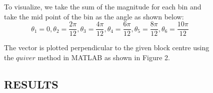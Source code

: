 \documentclass[letter, 10pt]{article}
\begin{document}
\begin{figure}[!h]
To visualize, we take the sum of the magnitude for each bin and take the mid point of the bin as the angle as shown below:
\begin{equation*}
    \theta_1 = 0, \theta_2 = \frac{2\pi}{12}, \theta_3 = \frac{4\pi}{12}, \theta_4 = \frac{6\pi}{12}, \theta_5 = \frac{8\pi}{12}, \theta_6 = \frac{10\pi}{12}
\end{equation*}

The vector is plotted perpendicular to the given block centre using the $quiver$ method in MATLAB as shown in Figure 2. 
\subsection*{RESULTS}


\end{figure}
\end{document}
